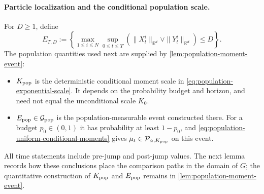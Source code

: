 \paragraph{Particle localization and the conditional population scale.}
For $D\ge1$, define
\begin{equation}
\label{eq:sample-localization-event}
 E_{T,D}:=\left\{\max_{1\le i\le N}\sup_{0\le t\le T}
                    (\|X_t^i\|_{\mathbb R^d}\vee\|Y_t^i\|_{\mathbb R^d})\le D\right\}.
\end{equation}
The population quantities used next are supplied by
\cref{lem:population-moment-event}:
\begin{itemize}[leftmargin=*]
\item $K_{\rm pop}$ is the deterministic conditional moment scale in
\eqref{eq:population-exponential-scale}. It depends on the probability
budget and horizon, and need not equal the unconditional scale $K_0$.
\item $E_{\rm pop}\in\mathcal G_{\rm pop}$ is the population-measurable
event constructed there. For a budget $p_0\in(0,1)$ it has probability
at least $1-p_0$, and \eqref{eq:population-uniform-conditional-moments}
gives $\mu_t\in\mathcal P_{\alpha,K_{\rm pop}}$ on this event.
\end{itemize}
All time statements include pre-jump and post-jump values. The next
lemma records how these conclusions place the comparison paths in
the domain of $G$; the quantitative construction of $K_{\rm pop}$
and $E_{\rm pop}$ remains in \cref{lem:population-moment-event}.

